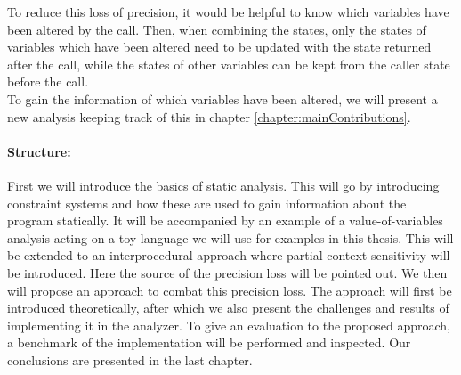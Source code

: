 To reduce this loss of precision, it would be helpful to know which variables have been altered by the call. Then, when combining the states, only the states of variables which have been altered need to be updated with the state returned after the call, while the states of other variables can be kept from the caller state before the call.\\
To gain the information of which variables have been altered, we will present a new analysis keeping track of this in chapter \ref{chapter:mainContributions}.

\paragraph{Structure:} %
First we will introduce the basics of static analysis. This will go by introducing constraint systems and how these are used to gain information about the program statically. It will be accompanied by an example of a value-of-variables analysis acting on a toy language we will use for examples in this thesis. This will be extended to an interprocedural approach where partial context sensitivity will be introduced. Here the source of the precision loss will be pointed out. We then will propose an approach to combat this precision loss. The approach will first be introduced theoretically, after which we also present the challenges and results of implementing it in the \Gob analyzer. To give an evaluation to the proposed approach, a benchmark of the implementation will be performed and inspected. Our conclusions are presented in the last chapter.
